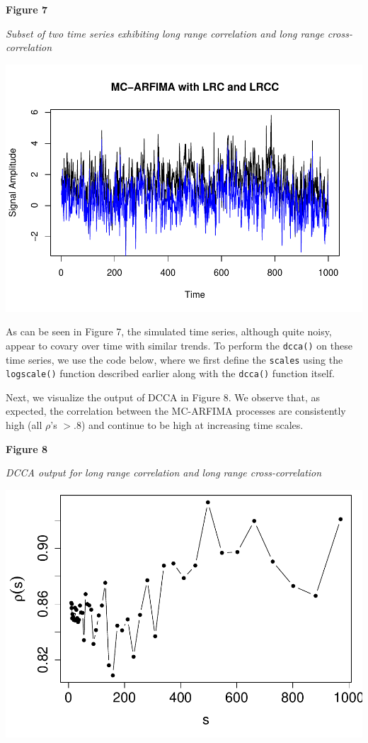 \documentclass[
  man]{apa6}
\begin{document}
\textbf{Figure 7}

\emph{Subset of two time series exhibiting long range correlation and long
range cross-correlation}

\includegraphics{fractal_regression_paper_brm_files/figure-latex/unnamed-chunk-15-1.pdf}

As can be seen in Figure 7, the simulated time series, although quite
noisy, appear to covary over time with similar trends. To perform the
\texttt{dcca()} on these time series, we use the code below, where we first
define the \texttt{scales} using the \texttt{logscale()} function described earlier
along with the \texttt{dcca()} function itself.

Next, we visualize the output of DCCA in Figure 8. We observe that, as
expected, the correlation between the MC-ARFIMA processes are
consistently high (all \(\rho\)'s \(> .8\)) and continue to be high at
increasing time scales.

\textbf{Figure 8}

\emph{DCCA output for long range correlation and long range
cross-correlation}

\includegraphics{fractal_regression_paper_brm_files/figure-latex/unnamed-chunk-17-1.pdf}
\end{document}
